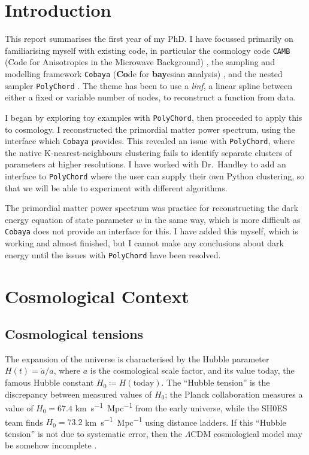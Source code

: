 \documentclass{article}
\begin{document}
\newpage

\tableofcontents

\newpage

\section{Introduction}
This report summarises the first year of my PhD. I have focussed primarily on familiarising myself with existing code, in particular the cosmology code \texttt{CAMB} (Code for Anisotropies in the Microwave Background) \cite{CAMB_1, CAMB_2}, the sampling and modelling framework \texttt{Cobaya} (\textbf{Co}de for \textbf{bay}esian \textbf{a}nalysis) \cite{Cobaya}, and the nested sampler \texttt{PolyChord} \cite{PolyChord_1, PolyChord_2}. The theme has been to use a \textit{linf}, a linear spline between either a fixed or variable number of nodes, to reconstruct a function from data.

I began by exploring toy examples with \texttt{PolyChord}, then proceeded to apply this to cosmology. I reconstructed the primordial matter power spectrum, using the interface which \texttt{Cobaya} provides. This revealed an issue with \texttt{PolyChord}, where the native K-nearest-neighbours clustering fails to identify separate clusters of parameters at higher resolutions. I have worked with Dr.~Handley to add an interface to \texttt{PolyChord} where the user can supply their own Python clustering, so that we will be able to experiment with different algorithms.

The primordial matter power spectrum was practice for reconstructing the dark energy equation of state parameter $w$ in the same way, which is more difficult as \texttt{Cobaya} does not provide an interface for this. I have added this myself, which is working and almost finished, but I cannot make any conclusions about dark energy until the issues with \texttt{PolyChord} have been resolved. 

\section{Cosmological Context}
\label{sec:context}
\subsection{Cosmological tensions}
\label{ssec:tension}
The expansion of the universe is characterised by the Hubble parameter $H(t)=\dot{a}/a$, where $a$ is the cosmological scale factor, and its value today, the famous Hubble constant $H_0 \coloneqq H(\textrm{today})$. The ``Hubble tension'' is the discrepancy between measured values of $H_0$; the Planck collaboration measures a value of $H_0=67.4$ \unit{km.s^{-1}.Mpc^{-1}} from the early universe, while the SH0ES team finds $H_0=73.2$ \unit{km.s^{-1}.Mpc^{-1}} using distance ladders. If this ``Hubble tension'' is not due to systematic error, then the $\Lambda$CDM cosmological model may be somehow incomplete \cite{buyers-guide}.
\end{document}
